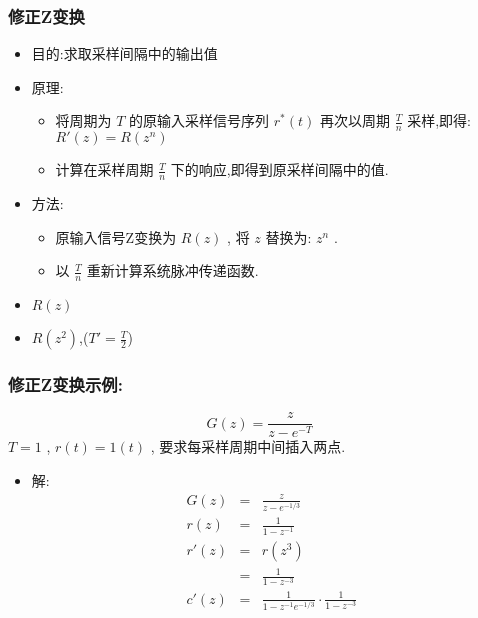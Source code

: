 \documentclass[table]{beamer}
\begin{document}
\begin{frame}
\frametitle{修正Z变换}
\label{sec-4-5-2}

\begin{itemize}
\item 目的:求取采样间隔中的输出值
\item 原理:
\begin{itemize}
\item <2->将周期为  $T$  的原输入采样信号序列 $r^*(t)$ 再次以周期  $\frac{T}{n}$  采样,即得:  $R'(z)=R(z^n)$
\item <3->计算在采样周期  $\frac{T}{n}$  下的响应,即得到原采样间隔中的值.
\end{itemize}
\item 方法:
\begin{itemize}
\item <4->原输入信号Z变换为  $R(z)$ , 将 $z$  替换为:  $z^n$  .
\item <5->以  $\frac{T}{n}$ 重新计算系统脉冲传递函数.
\end{itemize}
\end{itemize}
\begin{itemize}

\item $R(z)$
\label{sec-4-5-2-1}%

\item $R(z^2)$,($T'=\frac{T}{2}$)
\label{sec-4-5-2-2}%
\end{itemize} %
\end{frame}
\begin{frame}
\frametitle{修正Z变换示例:}
\label{sec-4-5-3}

\[G(z)=\frac{z}{z-e^{-T}}\]
   $T=1$ ,  $r(t)=1(t)$ , 要求每采样周期中间插入两点.

\begin{itemize}
\item 解:
      \begin{eqnarray*}
      G(z) &= & \frac{z}{z-e^{-1/3}} \\
      r(z) &=& \frac{1}{1-z^{-1}} \\
      r'(z) &=& r(z^3) \\
      &=& \frac{1}{1-z^{-3}} \\
      c'(z) &=& \frac{1}{1-z^{-1}e^{-1/3}}\cdot\frac{1}{1-z^{-3}}
      \end{eqnarray*}
\end{itemize}
\end{frame}
\end{document}
